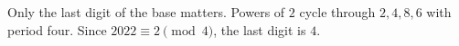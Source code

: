 Only the last digit of the base matters. Powers of $2$ cycle through $2,4,8,6$ with period four. Since $2022\equiv2\pmod4$, the last digit is $\boxed4$.
